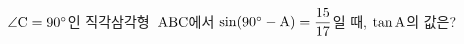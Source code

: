 $\angle\mathrm{C}=90^\circ$인 직각삼각형~$\mathrm{ABC}$에서 $\sin(90^\circ-\mathrm{A})=\dfrac{15}{17}$일 때, $\tan\mathrm{A}$의 값은?
